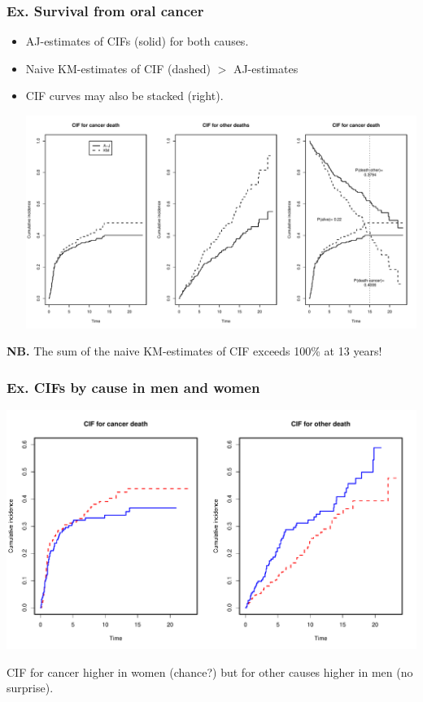 \documentclass[handout,12pt,dvipsnames,t]{beamer}
\begin{document}
\begin{frame}[fragile]
\frametitle{Ex. Survival from oral cancer}
\begin{itemize}
\item
AJ-estimates of CIFs (solid) for both causes.
\item
Naive KM-estimates of CIF (dashed) $>$ AJ-estimates 
\item
CIF curves may also be stacked (right).  

\includegraphics{Survival_competing_risk-plotcif1}

\end{itemize}


\textbf{NB.} The sum of the naive KM-estimates of CIF exceeds 100\% at 13 years! 
\end{frame}

\begin{frame}[fragile]
\frametitle{Ex. CIFs by cause in men and women}

\includegraphics{Survival_competing_risk-plotcif2}

CIF for cancer higher in women (chance?) but for other causes
higher in men (no surprise).

\end{frame}
\end{document}
